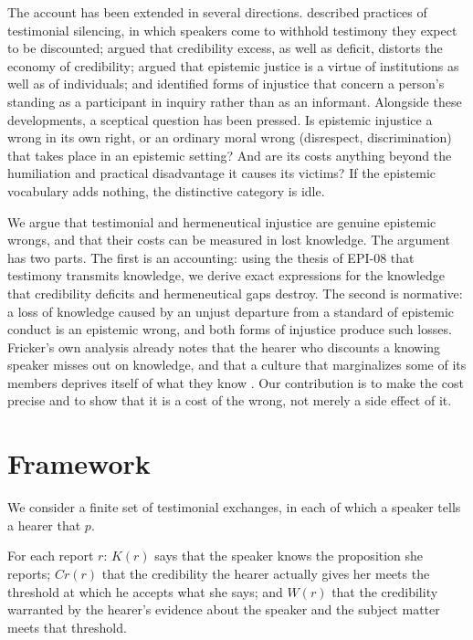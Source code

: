 \documentclass{situationist-preprint}
\begin{document}
The account has been extended in several directions. \citet{Dotson2011} described practices of testimonial silencing, in which speakers come to withhold testimony they expect to be discounted; \citet{Medina2013} argued that credibility excess, as well as deficit, distorts the economy of credibility; \citet{Anderson2012} argued that epistemic justice is a virtue of institutions as well as of individuals; and \citet{Hookway2010} identified forms of injustice that concern a person's standing as a participant in inquiry rather than as an informant. Alongside these developments, a sceptical question has been pressed. Is epistemic injustice a wrong in its own right, or an ordinary moral wrong (disrespect, discrimination) that takes place in an epistemic setting? And are its costs anything beyond the humiliation and practical disadvantage it causes its victims? If the epistemic vocabulary adds nothing, the distinctive category is idle.

We argue that testimonial and hermeneutical injustice are genuine epistemic wrongs, and that their costs can be measured in lost knowledge. The argument has two parts. The first is an accounting: using the thesis of EPI-08 that testimony transmits knowledge, we derive exact expressions for the knowledge that credibility deficits and hermeneutical gaps destroy. The second is normative: a loss of knowledge caused by an unjust departure from a standard of epistemic conduct is an epistemic wrong, and both forms of injustice produce such losses. Fricker's own analysis already notes that the hearer who discounts a knowing speaker misses out on knowledge, and that a culture that marginalizes some of its members deprives itself of what they know \citep{Fricker2007}. Our contribution is to make the cost precise and to show that it is a cost of the wrong, not merely a side effect of it.

\section{Framework}

We consider a finite set of testimonial exchanges, in each of which a speaker tells a hearer that $p$.

\begin{definition}[Reports]\label{d:report}
For each report $r$: $K(r)$ says that the speaker knows the proposition she reports; $\mathit{Cr}(r)$ that the credibility the hearer actually gives her meets the threshold at which he accepts what she says; and $W(r)$ that the credibility warranted by the hearer's evidence about the speaker and the subject matter meets that threshold.
\end{definition}
\end{document}
